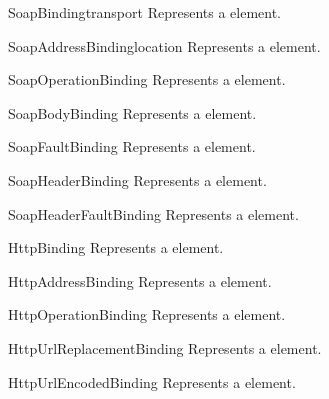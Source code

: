 \begin{classdesc}{SoapBinding}{transport}
Represents a  element.
\end{classdesc}

\begin{classdesc}{SoapAddressBinding}{location}
Represents a  element.
\end{classdesc}

\begin{classdesc}{SoapOperationBinding}{}
Represents a  element.
\end{classdesc}

\begin{classdesc}{SoapBodyBinding}{}
Represents a  element.
\end{classdesc}

\begin{classdesc}{SoapFaultBinding}{}
Represents a  element.
\end{classdesc}

\begin{classdesc}{SoapHeaderBinding}{}
Represents a  element.
\end{classdesc}

\begin{classdesc}{SoapHeaderFaultBinding}{}
Represents a  element.
\end{classdesc}

\begin{classdesc}{HttpBinding}{}
Represents a  element.
\end{classdesc}

\begin{classdesc}{HttpAddressBinding}{}
Represents a  element.
\end{classdesc}

\begin{classdesc}{HttpOperationBinding}{}
Represents a  element.
\end{classdesc}

\begin{classdesc}{HttpUrlReplacementBinding}{}
Represents a  element.
\end{classdesc}

\begin{classdesc}{HttpUrlEncodedBinding}{}
Represents a  element.
\end{classdesc}

